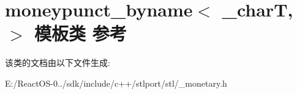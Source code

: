 \hypertarget{classmoneypunct__byname}{}\section{moneypunct\+\_\+byname$<$ \+\_\+charT, $>$ 模板类 参考}
\label{classmoneypunct__byname}


该类的文档由以下文件生成\+:\begin{DoxyCompactItemize}
\item 
E\+:/\+React\+O\+S-\/0../sdk/include/c++/stlport/stl/\+\_\+monetary.\+h\end{DoxyCompactItemize}
